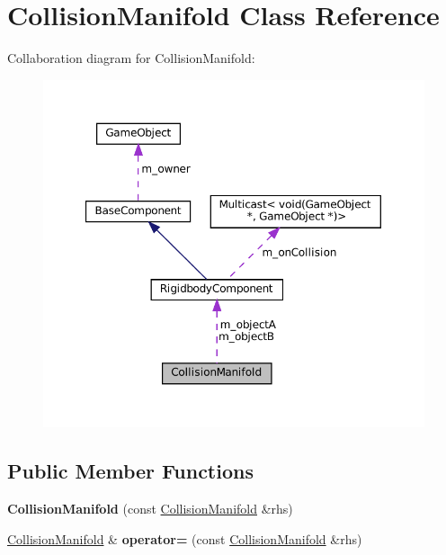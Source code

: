 \hypertarget{classCollisionManifold}{}\section{Collision\+Manifold Class Reference}
\label{classCollisionManifold}


Collaboration diagram for Collision\+Manifold\+:\nopagebreak
\begin{figure}[H]
\begin{center}
\leavevmode
\includegraphics[width=350pt]{classCollisionManifold__coll__graph}
\end{center}
\end{figure}
\subsection*{Public Member Functions}
\begin{DoxyCompactItemize}
\item 
\mbox{\label{classCollisionManifold_a46e84805aa00f1773719d79f2308deae}} 
{\bfseries Collision\+Manifold} (const \hyperlink{classCollisionManifold}{Collision\+Manifold} \&rhs)
\item 
\mbox{\label{classCollisionManifold_aa037e82ecbe29d22f28427eeef01676b}} 
\hyperlink{classCollisionManifold}{Collision\+Manifold} \& {\bfseries operator=} (const \hyperlink{classCollisionManifold}{Collision\+Manifold} \&rhs)
\end{DoxyCompactItemize}
